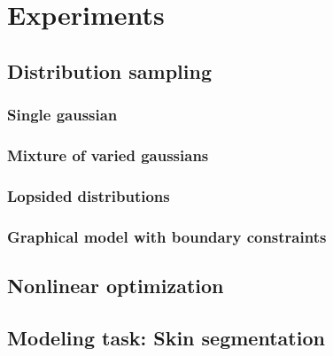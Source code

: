 \section{Experiments}
\subsection{Distribution sampling}
\subsubsection{Single gaussian}

\subsubsection{Mixture of varied gaussians}
\subsubsection{Lopsided distributions}
\subsubsection{Graphical model with boundary constraints}

\subsection{Nonlinear optimization}
\subsection{Modeling task: Skin segmentation}
